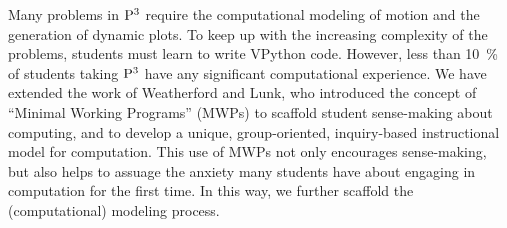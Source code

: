 \documentclass{msuphddissertation}
\begin{document}
\begin{doublespace}
Many problems in ${\rm P}^{3}$ require the computational modeling of motion and the generation of dynamic plots.  To keep up with the increasing complexity of the problems, students must learn to write VPython code.  However, less than \SI{10}{\percent} of students taking ${\rm P}^{3}$ have any significant computational experience.  We have extended the work of Weatherford\cite{weatherford2011student} and Lunk,\cite{lunk2012framework} who introduced the concept of ``Minimal Working Programs'' (MWPs) to scaffold student sense-making about computing, and to develop a unique, group-oriented, inquiry-based instructional model for computation.  This use of MWPs not only encourages sense-making, but also helps to assuage the anxiety many students have about engaging in computation for the first time.  In this way, we further scaffold the (computational) modeling process.


\end{doublespace}
\end{document}
